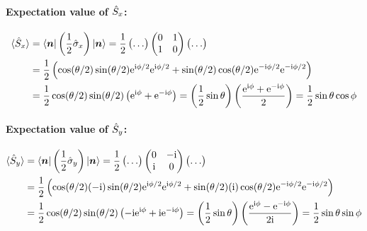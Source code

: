 \paragraph{Expectation value of $\hat{S}_x$:}
\begin{equation}\begin{aligned}
    \langle \hat{S}_x \rangle &= \langle\bm{n}| \left(\frac{1}{2}\hat{\sigma}_x\right) |\bm{n}\rangle
    = \frac{1}{2} \begin{pmatrix} \dots \end{pmatrix}
      \begin{pmatrix} 0 & 1 \\ 1 & 0 \end{pmatrix}
      \begin{pmatrix} \dots \end{pmatrix} \\
    &= \frac{1}{2} \left( \cos(\theta/2)\sin(\theta/2) \mathrm{e}^{\mathrm{i}\phi/2} \mathrm{e}^{\mathrm{i}\phi/2} + \sin(\theta/2)\cos(\theta/2) \mathrm{e}^{-\mathrm{i}\phi/2} \mathrm{e}^{-\mathrm{i}\phi/2} \right) \\
    &= \frac{1}{2} \cos(\theta/2)\sin(\theta/2) \left( \mathrm{e}^{\mathrm{i}\phi} + \mathrm{e}^{-\mathrm{i}\phi} \right)
    = \left(\frac{1}{2} \sin\theta\right) \left(\frac{\mathrm{e}^{\mathrm{i}\phi} + \mathrm{e}^{-\mathrm{i}\phi}}{2}\right)
    = \frac{1}{2} \sin\theta \cos\phi
\end{aligned}\end{equation}

\paragraph{Expectation value of $\hat{S}_y$:}
\begin{equation}\begin{aligned}
    \langle \hat{S}_y \rangle &= \langle\bm{n}| \left(\frac{1}{2}\hat{\sigma}_y\right) |\bm{n}\rangle
    = \frac{1}{2} \begin{pmatrix} \dots \end{pmatrix}
      \begin{pmatrix} 0 & -\mathrm{i} \\ \mathrm{i} & 0 \end{pmatrix}
      \begin{pmatrix} \dots \end{pmatrix} \\
    &= \frac{1}{2} \left( \cos(\theta/2)(-\mathrm{i})\sin(\theta/2) \mathrm{e}^{\mathrm{i}\phi/2} \mathrm{e}^{\mathrm{i}\phi/2} + \sin(\theta/2)(\mathrm{i})\cos(\theta/2) \mathrm{e}^{-\mathrm{i}\phi/2} \mathrm{e}^{-\mathrm{i}\phi/2} \right) \\
    &= \frac{1}{2} \cos(\theta/2)\sin(\theta/2) \left( -\mathrm{i} \mathrm{e}^{\mathrm{i}\phi} + \mathrm{i} \mathrm{e}^{-\mathrm{i}\phi} \right)
    = \left(\frac{1}{2} \sin\theta\right) \left(\frac{\mathrm{e}^{\mathrm{i}\phi} - \mathrm{e}^{-\mathrm{i}\phi}}{2\mathrm{i}}\right)
    = \frac{1}{2} \sin\theta \sin\phi
\end{aligned}\end{equation}

